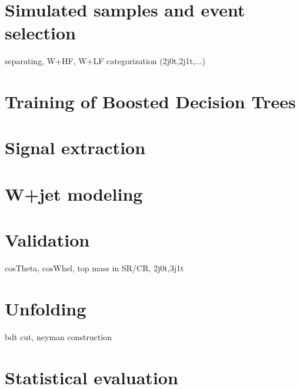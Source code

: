 \section{Simulated samples and event selection}

separating, W+HF, W+LF
categorization (2j0t,2j1t,...)


\section{Training of Boosted Decision Trees}



\section{Signal extraction}

\section{W+jet modeling}

\section{Validation}

cosTheta, cosWhel, top mass in SR/CR, 2j0t,3j1t

\section{Unfolding}

bdt cut, neyman construction

\section{Statistical evaluation}

